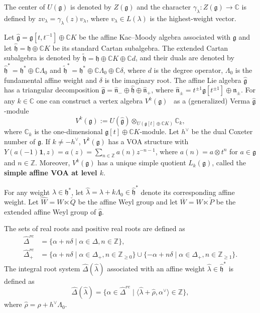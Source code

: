 \documentclass[12pt,a4paper,reqno]{amsart}
\numberwithin{equation}{section}
\theoremstyle{definition}
\newcommand{\g}{\mathfrak{g}}
\newcommand{\C}{\mathbb{C}}
\newcommand{\Z}{\mathbb{Z}}
\def\la{\lambda}
\def \h{\mathfrak{h}}
\def\vac{\mathbf{1}}
\def\o{\otimes}
\def\n{\mathfrak{n}}
\begin{document}
The center of $U(\g)$ is denoted by $Z(\g)$ and the character $\gamma_\la: Z(\g) \rightarrow \C$ is defined by $z v_\la = \gamma_\la(z) v_\la$, where $v_\la \in L(\la)$ is the highest-weight vector.




Let $\hat{\g} = \g[t,t^{-1}] \oplus \mathbb{C}K$ be the affine Kac--Moody algebra associated with $\g$ and let $\hat{\mathfrak{h}} = \mathfrak{h} \oplus \mathbb{C}K$ be its standard Cartan subalgebra. The extended Cartan subalgebra is denoted by $\tilde{\h} = \h \oplus \mathbb{C}K \oplus \mathbb{C}d$, and their duals are denoted by $\hat{\mathfrak{h}}^* = \mathfrak{h}^* \oplus \mathbb{C}\Lambda_0 $ and $\tilde{\mathfrak{h}}^* = \mathfrak{h}^* \oplus \mathbb{C}\Lambda_0 \oplus \mathbb{C}\delta$, where $d$ is the degree operator, $\Lambda_0$ is the fundamental affine weight and $\delta$ is the imaginary root. The affine Lie algebra $\hat{\g}$ has a triangular decomposition $\hat{\g} = \hat{\n}_- \oplus \hat{\h} \oplus \hat{\n}_+$, where $ \hat{\n}_\pm = t^{\pm 1}\g[t^{\pm1}] \oplus \n_\pm$. For any $k\in \C$ one can construct a vertex algebra $V^k(\g)$~\cite[Section 2]{FZ92} as a (generalized) Verma $\hat{\g}$-module
\begin{equation}
    V^k(\g):= U(\hat{\g})\otimes_{U(\g[t] \oplus \C K)} \C_k,
\end{equation}
where $\C_k$ is the one-dimensional $\g[t] \oplus \C K$-module.
Let $h^\vee$ be the dual Coxeter number of $\g$. If $k \neq -h^\vee$, $V^k(\g)$ has a VOA structure with $Y(a(-1)\vac,z)=a(z)=\sum_{n\in \Z} a(n) z^{-n-1}$, where $a(n)=a\o t^n$ for $a\in \g$ and $n\in \Z$.
Moreover, $V^k(\g)$ has a unique simple quotient $L_k(\g)$, called the \textbf{simple affine VOA at level $k$}. %


For any weight $\la \in \mathfrak{h}^*$, let $\hat{\la} = \la + k\Lambda_0 \in \hat{\mathfrak{h}}^*$ denote its corresponding affine weight. Let $\widehat{W} = W \ltimes \check{Q}$ be the affine Weyl group and let $\overline{W} = W \ltimes \check{P}$ be the extended affine Weyl group of $\hat{\g}$.


The sets of real roots and positive real roots are defined as
\[
\begin{split}
    \hat{\Delta}^{re} &= \{\alpha + n \delta \mid \alpha \in \Delta, n \in \Z\}, \\
    \hat{\Delta}^{re}_+ &= \{\alpha + n \delta \mid \alpha \in \Delta_+, n \in \Z_{\ge0}\} \cup \{-\alpha + n \delta \mid \alpha \in \Delta_+, n \in \Z_{\ge1}\}.
\end{split}
\]
The integral root system $\hat{\Delta}(\hat{\la})$ associated with an affine weight $\hat{\la} \in \hat{\mathfrak{h}}^*$ is defined as
\[
\hat{\Delta}(\hat{\la}) = \{\alpha \in \hat{\Delta}^{re} \mid \langle \hat{\la}+\hat{\rho}, \alpha^{\vee} \rangle \in \mathbb{Z}\},
\]
where $\hat{\rho} = \rho + h^{\vee}\Lambda_0$.
\end{document}
